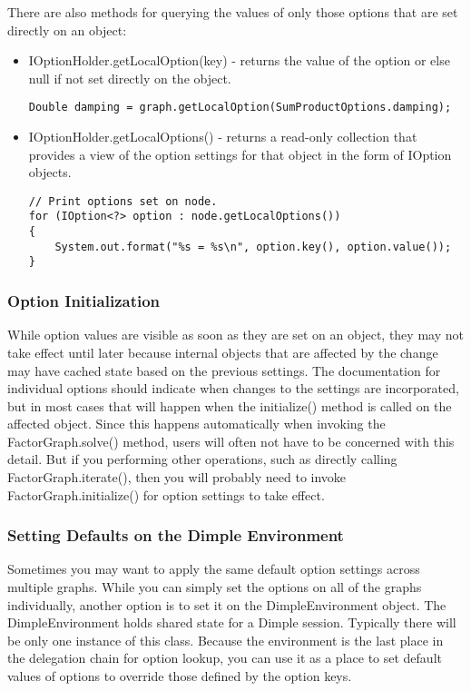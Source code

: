 There are also methods for querying the values of only those options that are set directly on an object:

\begin{itemize}
\item IOptionHolder.getLocalOption(key) - returns the value of the option or else null if not set directly on the object.
\begin{lstlisting}
Double damping = graph.getLocalOption(SumProductOptions.damping);
\end{lstlisting}

\item IOptionHolder.getLocalOptions() - returns a read-only collection that provides a view of the option settings for that object in the form of IOption objects.
\begin{lstlisting}
// Print options set on node.
for (IOption<?> option : node.getLocalOptions())
{
    System.out.format("%s = %s\n", option.key(), option.value());
}
\end{lstlisting}
\end{itemize}

\fi %

\subsubsection{Option Initialization}

While option values are visible as soon as they are set on an object, they may not take effect until later because internal objects that are affected by the change may have cached state based on the previous settings. The documentation for individual options should indicate when changes to the settings are incorporated, but in most cases that will happen when the initialize() method is called on the affected object. Since this happens automatically when invoking the FactorGraph.solve() method, users will often not have to be concerned with this detail. But if you performing other operations, such as directly calling FactorGraph.iterate(), then you will probably need to invoke FactorGraph.initialize() for option settings to take effect.

\subsubsection{Setting Defaults on the Dimple Environment}

Sometimes you may want to apply the same default option settings across multiple graphs. While you can simply set the options on all of the graphs individually, another option is to set it on the DimpleEnvironment object. The DimpleEnvironment holds shared state for a Dimple session. Typically there will be only one instance of this class. Because the environment is the last place in the delegation chain for option lookup, you can use it as a place to set default values of options to override those defined by the option keys.

